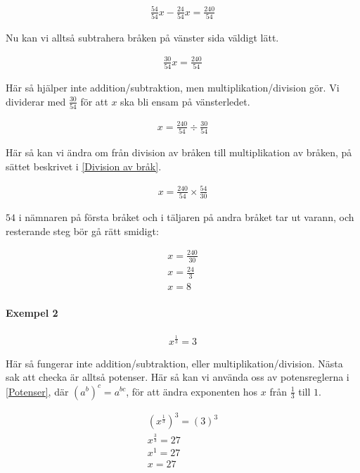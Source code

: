 \begin{align}
	\frac{54}{54}x - \frac{24}{54}x = \frac{240}{54}
\end{align}

Nu kan vi alltså subtrahera bråken på vänster sida väldigt lätt.

\begin{align}
	\frac{30}{54}x = \frac{240}{54}
\end{align}

Här så hjälper inte addition/subtraktion, men multiplikation/division gör. Vi dividerar med $\frac{30}{54}$ för att $x$ ska bli ensam på vänsterledet.

\begin{align}
	x = \frac{240}{54} \div \frac{30}{54}
\end{align}

Här så kan vi ändra om från division av bråken till multiplikation av bråken, på sättet beskrivet i \ref{Division av bråk}.

\begin{align}
	x = \frac{240}{54} \times \frac{54}{30}
\end{align}

$54$ i nämnaren på första bråket och i täljaren på andra bråket tar ut varann, och resterande steg bör gå rätt smidigt:

\begin{align}
	x = \frac{240}{30} \\
	x = \frac{24}{3} \\
	x = 8
\end{align}

\paragraph{Exempel 2}

\begin{align}
	x^{\frac{1}{3}} = 3
\end{align}

Här så fungerar inte addition/subtraktion, eller multiplikation/division. Nästa sak att checka är alltså potenser. Här så kan vi använda oss av potensreglerna i \ref{Potenser}, där $(a^b)^c = a^{bc}$, för att ändra exponenten hos $x$ från $\frac{1}{3}$ till $1$.

\begin{align}
	(x^{\frac{1}{3}})^{3} = (3)^3 \\
	x^{\frac{3}{3}} = 27 \\
	x^1 = 27 \\
	x = 27
\end{align}

